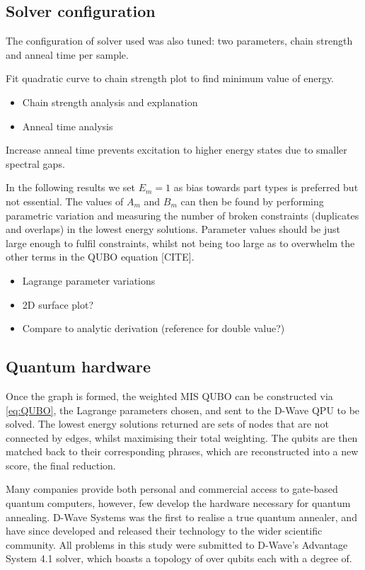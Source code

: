 \documentclass[12pt]{article}
\theoremstyle{definition}
\begin{document}
\subsection{Solver configuration}

The configuration of solver used was also tuned: two parameters, chain strength and anneal time per sample.

Fit quadratic curve to chain strength plot to find minimum value of energy.

\begin{itemize}
    \item Chain strength analysis and explanation
    \item Anneal time analysis
\end{itemize}

Increase anneal time prevents excitation to higher energy states due to smaller spectral gaps.

In the following results we set $E_m=1$ as bias towards part types is preferred but not essential. The values of $A_m$ and $B_m$ can then be found by performing parametric variation and measuring the number of broken constraints (duplicates and overlaps) in the lowest energy solutions. Parameter values should be just large enough to fulfil constraints, whilst not being too large as to overwhelm the other terms in the QUBO equation [CITE].

\begin{itemize}
    \item Lagrange parameter variations
    \item 2D surface plot?
    \item Compare to analytic derivation (reference for double value?)
\end{itemize}

\subsection{Quantum hardware}

Once the graph is formed, the weighted MIS QUBO can be constructed via \cref{eq:QUBO}, the Lagrange parameters chosen, and sent to the D-Wave QPU to be solved. The lowest energy solutions returned are sets of nodes that are not connected by edges, whilst maximising their total weighting. The qubits are then matched back to their corresponding phrases, which are reconstructed into a new score, the final reduction.

Many companies provide both personal and commercial access to gate-based quantum computers, however, few develop the hardware necessary for quantum annealing. D-Wave Systems was the first to realise a true quantum annealer, and have since developed and released their technology to the wider scientific community. All problems in this study were submitted to D-Wave's Advantage System 4.1 solver, which boasts a topology of over qubits each with a degree of.
\end{document}
